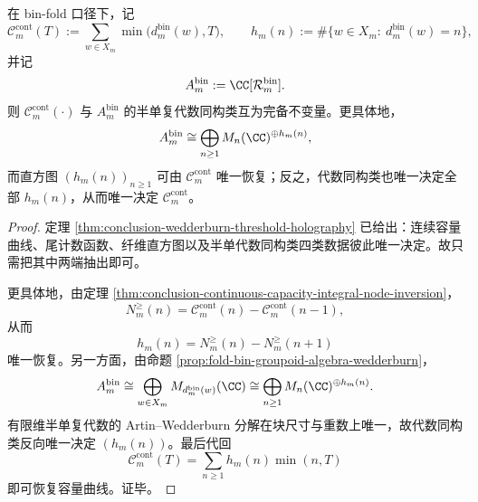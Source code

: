 \begin{theorem}[连续容量曲线与纤维群胚半单代数的互逆完备性]\label{thm:conclusion-capacity-groupoid-bidirectional-complete-invariant}
在 bin-fold 口径下，记
\[
\mathcal C_m^{\mathrm{cont}}(T):=
\sum_{w\in X_m}\min\bigl(d_m^{\mathrm{bin}}(w),T\bigr),
\qquad
h_m(n):=\#\{w\in X_m:\ d_m^{\mathrm{bin}}(w)=n\},
\]
并记
\[
A_m^{\mathrm{bin}}:=\CC[\mathcal R_m^{\mathrm{bin}}].
\]
则 \(\mathcal C_m^{\mathrm{cont}}(\cdot)\) 与 \(A_m^{\mathrm{bin}}\) 的半单复代数同构类互为完备不变量。更具体地，
\[
A_m^{\mathrm{bin}}
\cong
\bigoplus_{n\ge 1} M_n(\CC)^{\oplus h_m(n)},
\]
而直方图 \((h_m(n))_{n\ge 1}\) 可由 \(\mathcal C_m^{\mathrm{cont}}\) 唯一恢复；反之，代数同构类也唯一决定全部 \(h_m(n)\)，从而唯一决定 \(\mathcal C_m^{\mathrm{cont}}\)。
\end{theorem}
\begin{proof}
定理 \ref{thm:conclusion-wedderburn-threshold-holography} 已给出：连续容量曲线、尾计数函数、纤维直方图以及半单代数同构类四类数据彼此唯一决定。故只需把其中两端抽出即可。

更具体地，由定理 \ref{thm:conclusion-continuous-capacity-integral-node-inversion}，
\[
N_m^{\ge}(n)=\mathcal C_m^{\mathrm{cont}}(n)-\mathcal C_m^{\mathrm{cont}}(n-1),
\]
从而
\[
h_m(n)=N_m^{\ge}(n)-N_m^{\ge}(n+1)
\]
唯一恢复。另一方面，由命题 \ref{prop:fold-bin-groupoid-algebra-wedderburn}，
\[
A_m^{\mathrm{bin}}
\cong
\bigoplus_{w\in X_m}M_{d_m^{\mathrm{bin}}(w)}(\CC)
\cong
\bigoplus_{n\ge 1} M_n(\CC)^{\oplus h_m(n)}.
\]
有限维半单复代数的 Artin--Wedderburn 分解在块尺寸与重数上唯一，故代数同构类反向唯一决定 \((h_m(n))\)。最后代回
\[
\mathcal C_m^{\mathrm{cont}}(T)=\sum_{n\ge 1}h_m(n)\min(n,T)
\]
即可恢复容量曲线。证毕。
\end{proof}

